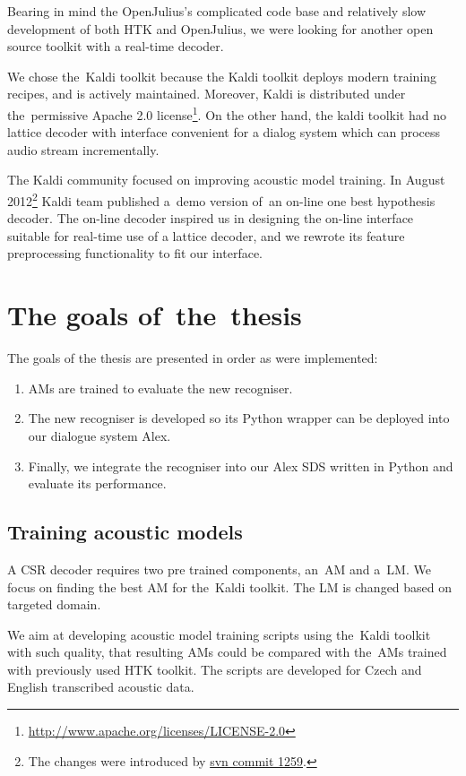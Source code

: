Bearing in mind the OpenJulius's complicated code base and relatively slow development of both \ac{HTK} and OpenJulius, we were looking for another open source toolkit with a real-time decoder.

We chose the~Kaldi toolkit because the Kaldi toolkit deploys modern training recipes, and is actively maintained. 
Moreover, Kaldi is distributed under the~permissive Apache 2.0 license\footnote{\url{http://www.apache.org/licenses/LICENSE-2.0}}.
On the other hand, the kaldi toolkit had no lattice decoder with interface convenient for a dialog system which can process audio stream incrementally.

The Kaldi community focused on improving acoustic model training. 
In August 2012\footnote{The changes were introduced by \href{https://sourceforge.net/p/kaldi/code/1259/}{svn commit 1259}.} Kaldi team published a~demo version of~an on-line one best hypothesis decoder.
The on-line decoder inspired us in designing the on-line interface suitable for real-time use of a lattice decoder, and we rewrote its feature preprocessing functionality to fit our interface.

\section{The goals of~the~thesis} 
\label{sec:goals}
The goals of the thesis are presented in order as were implemented:
\begin{enumerate}
    \item \acp{AM} are trained to evaluate the new recogniser.
    \item The new recogniser is developed so its Python wrapper can be deployed into our dialogue system Alex.
    \item Finally, we integrate the recogniser into our Alex \ac{SDS} written in Python and evaluate its performance.
\end{enumerate}

\subsection{Training acoustic models} 
\label{sub:training_kaldi_acoustic_models}
A \acl{CSR} decoder requires two pre trained components, an~\acl{AM} and a~\acl{LM}. 
We focus on finding the best \acl{AM} for the~Kaldi toolkit. 
The \acl{LM} is changed based on targeted domain.

We aim at developing acoustic model training scripts using the~Kaldi toolkit with such quality, that resulting \acp{AM} could be compared with the~\acp{AM} trained with previously used \ac{HTK} toolkit. 
The scripts are developed for Czech and English transcribed acoustic data.


